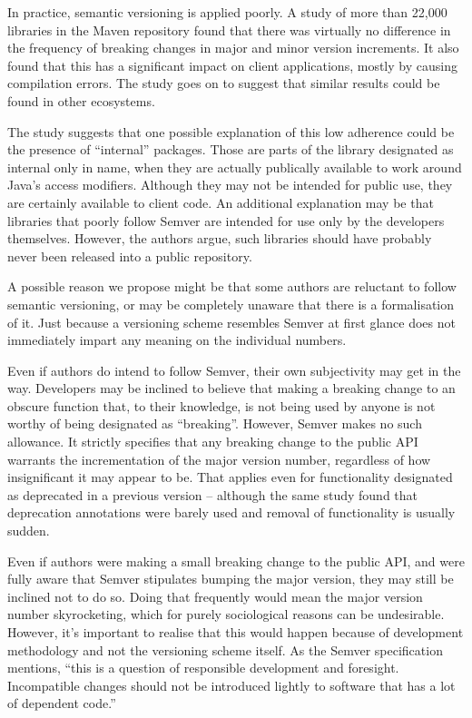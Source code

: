 \documentclass{l4proj}
\begin{document}
In practice, semantic versioning is applied poorly. A
study \cite{SemverMaven} of more than 22,000 libraries in the Maven
repository found that there was virtually no difference in the
frequency of breaking changes in major and minor version increments.
It also found that this has a significant impact on client
applications, mostly by causing compilation errors. The study goes on
to suggest that similar results could be found in other ecosystems.

The study suggests that one possible explanation of this low adherence
could be the presence of ``internal'' packages. Those are parts of the
library designated as internal only in name, when they are actually
publically available to work around Java's access modifiers. Although
they may not be intended for public use, they are certainly available
to client code. An additional explanation may be that libraries that
poorly follow Semver are intended for use only by the developers
themselves. However, the authors argue, such libraries should have
probably never been released into a public repository.

A possible reason we propose might be that some authors are reluctant
to follow semantic versioning, or may be completely unaware that there
is a formalisation of it. Just because a versioning scheme resembles
Semver at first glance does not immediately impart any meaning on the
individual numbers.

Even if authors do intend to follow Semver, their own subjectivity may
get in the way. Developers may be inclined to believe that making a
breaking change to an obscure function that, to their knowledge, is
not being used by anyone is not worthy of being designated as
``breaking''. However, Semver makes no such allowance. It strictly
specifies that any breaking change to the public API warrants
the incrementation of the major version number, regardless of how
insignificant it may appear to be. That applies even for functionality
designated as deprecated in a previous version -- although the same
study found that deprecation annotations were barely used and removal
of functionality is usually sudden.

Even if authors were making a small breaking change to the public API,
and were fully aware that Semver stipulates bumping the major version,
they may still be inclined not to do so. Doing that frequently would
mean the major version number skyrocketing, which for purely
sociological reasons can be undesirable. However, it's important to
realise that this would happen because of development methodology and
not the versioning scheme itself. As the Semver specification
mentions, ``this is a question of responsible development and
foresight. Incompatible changes should not be introduced lightly to
software that has a lot of dependent code.''
\end{document}
